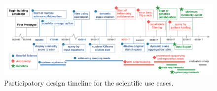 \begin{figure}[!ht]
\centering
\captionsetup{justification=centering,margin=2cm}
\vspace{-10pt}
\includegraphics[width=6in]{figures/timeline_new.pdf}
\vspace{-6pt}\caption{Participatory design timeline for the scientific use cases.}
\label{timeline}
\vspace{-10pt}
\end{figure}
